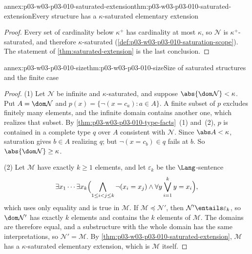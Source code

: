 \begin{annexitem}{annex:p03-w03-p03-010-saturated-extension}{thm:p03-w03-p03-010-saturated-extension}{Every structure has a \(\kappa\)-saturated elementary extension}
\begin{proof}
Every set of cardinality below \(\kappa^+\) has cardinality at most
\(\kappa\), so \(\mathcal N\) is \(\kappa^+\)-saturated, and therefore
\(\kappa\)-saturated (\cref{def:p03-w03-p03-010-saturation-scope}).  The
statement of \cref{thm:saturated-extension} is the last conclusion.
\end{proof}
\end{annexitem}

\begin{annexitem}{annex:p03-w03-p03-010-size}{thm:p03-w03-p03-010-size}{Size of saturated structures and the finite case}
\begin{proof}
(1) Let \(\mathcal N\) be infinite and \(\kappa\)-saturated, and suppose
\(\abs{\dom\mathcal N}<\kappa\).  Put \(A=\dom\mathcal N\) and
\(p(x)=\{\neg(x=c_a):a\in A\}\).  A finite subset of \(p\) excludes
finitely many elements, and the infinite domain contains another one, which
realizes that subset.  By \cref{thm:p03-w03-p03-010-type-facts}~(1) and~(2),
\(p\) is contained in a complete type \(q\) over \(A\) consistent with
\(\mathcal N\).  Since \(\abs A<\kappa\), saturation gives \(b\in A\)
realizing \(q\); but \(\neg(x=c_b)\in q\) fails at \(b\).  So
\(\abs{\dom\mathcal N}\geq\kappa\).

(2) Let \(\mathcal M\) have exactly \(k\geq1\) elements, and let
\(\varepsilon_k\) be the \(\Lang\)-sentence
\[
  \exists x_1\cdots\exists x_k\Bigl(\bigwedge_{1\leq i<j\leq k}\neg(x_i=x_j)
  \land\forall y\bigvee_{i=1}^{k}y=x_i\Bigr),
\]
which uses only equality and is true in \(\mathcal M\).  If
\(\mathcal M\preccurlyeq\mathcal N'\), then \(\mathcal N'\entails
\varepsilon_k\), so \(\dom\mathcal N'\) has exactly \(k\) elements and
contains the \(k\) elements of \(\mathcal M\).  The domains are therefore
equal, and a substructure with the whole domain has the same
interpretations, so \(\mathcal N'=\mathcal M\).  By
\cref{thm:p03-w03-p03-010-saturated-extension}, \(\mathcal M\) has a
\(\kappa\)-saturated elementary extension, which is \(\mathcal M\) itself.
\end{proof}
\end{annexitem}

